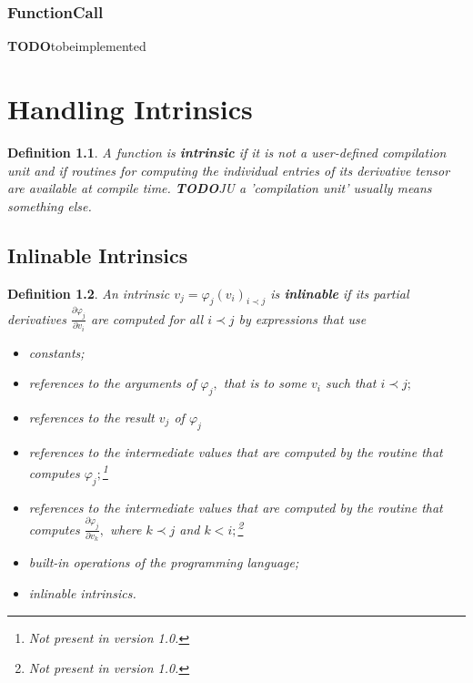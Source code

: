 \documentclass{book}
\newcommand{\todo}{{\bf TODO}}
\newtheorem{Def}{Definition}
\begin{document}
\subsection{FunctionCall}
\label{ssec:FunctionCall}
\todo tobeimplemented

\chapter{Handling Intrinsics}
\label{ch:Intrinsics}

\begin{Def} \label{def:intrinsic}
A function is {\bf intrinsic} if it is not a user-defined
compilation unit and if routines for computing
the individual entries of its derivative tensor are available
at compile time.
\todo JU a 'compilation unit' usually means something else.
\end{Def}

\section{Inlinable Intrinsics}
\label{sec:InlinableIntrinsics}

\begin{Def} \label{def:inlinable_intrinsic}
An intrinsic $v_j = \varphi_j(v_i)_{i \prec j}$ 
is {\bf inlinable} if its partial derivatives 
$\frac{\partial \varphi_j}{\partial v_i}$
are computed for all $i \prec j$ by expressions that use 
\begin{itemize}
\item constants;
\item references to the arguments of $\varphi_j,$ that is to some
$v_i$ such that $i \prec j;$
\item references to the result $v_j$ of $\varphi_j$ 
\item references to the intermediate values that are
computed by the routine that computes $\varphi_j;$\footnote[1]{Not present in version 1.0.}
\item references to the intermediate values that are
computed by the routine that computes 
$\frac{\partial \varphi_j}{\partial v_k},$ where $k \prec j$ and
$k < i;$\footnote[1]{Not present in version 1.0.}
\item built-in operations of the programming language;
\item inlinable intrinsics.
\end{itemize}
\end{Def}
\end{document}
